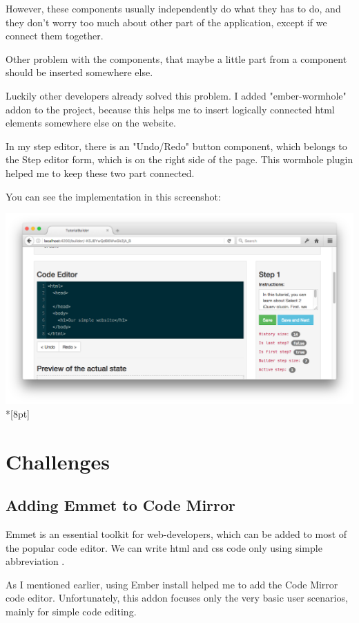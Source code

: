 \documentclass[12pt, a4paper, oneside, openright, medskipamount]{report}
\begin{document}
However, these components usually independently do what they has to do, and they don't worry too much about other part of the application, except if we connect them together.

Other problem with the components, that maybe a little part from a component should be inserted somewhere else.

Luckily other developers already solved this problem. I added "ember-wormhole" addon to the project, because this helps me to insert logically connected html elements somewhere else on the website.

In my step editor, there is an "Undo/Redo" button component, which belongs to the Step editor form, which is on the right side of the page. This wormhole plugin helped me to keep these two part connected.

You can see the implementation in this screenshot:

\includegraphics[width=1\textwidth]{assets/wormhole-screenshot.png}\\*[8pt]

\section{Challenges}

\subsection{Adding Emmet to Code Mirror}

Emmet is an essential toolkit for web-developers, which can be added to most of the popular code editor. We can write html and css code only using simple abbreviation \cite{emmet}.

As I mentioned earlier, using Ember install helped me to add the Code Mirror code editor. Unfortunately, this addon focuses only the very basic user scenarios, mainly for simple code editing.
\end{document}

